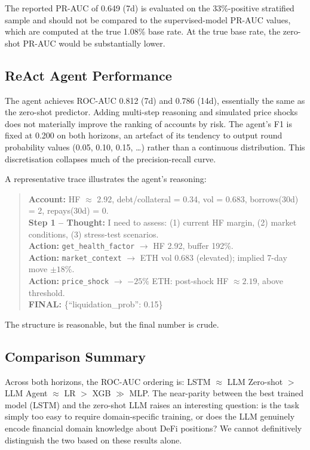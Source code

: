 \documentclass[12pt,a4paper]{article}
\begin{document}
The reported PR-AUC of 0.649 (7d) is evaluated on the 33\%-positive
stratified sample and should not be compared to the supervised-model
PR-AUC values, which are computed at the true 1.08\% base rate.  At the
true base rate, the zero-shot PR-AUC would be substantially lower.

\subsection{ReAct Agent Performance}

The agent achieves ROC-AUC 0.812 (7d) and 0.786 (14d), essentially the
same as the zero-shot predictor.  Adding multi-step reasoning and simulated
price shocks does not materially improve the ranking of accounts by risk.
The agent's F1 is fixed at 0.200 on both horizons, an artefact of its
tendency to output round probability values (0.05, 0.10, 0.15, \ldots)
rather than a continuous distribution.  This discretisation collapses much
of the precision-recall curve.

A representative trace illustrates the agent's reasoning:

\begin{quote}
\small
\textbf{Account:} HF $\approx$ 2.92, debt/collateral = 0.34,
vol = 0.683, borrows(30d) = 2, repays(30d) = 0.\\[0.3em]
\textbf{Step 1 -- Thought:} I need to assess: (1) current HF margin,
(2) market conditions, (3) stress-test scenarios.\\[0.3em]
\textbf{Action:} \texttt{get\_health\_factor} $\rightarrow$
HF 2.92, buffer 192\%.\\[0.3em]
\textbf{Action:} \texttt{market\_context} $\rightarrow$
ETH vol 0.683 (elevated); implied 7-day move $\pm 18$\%.\\[0.3em]
\textbf{Action:} \texttt{price\_shock} $\rightarrow$
$-25\%$ ETH: post-shock HF $\approx 2.19$, above threshold.\\[0.3em]
\textbf{FINAL:} \{``liquidation\_prob'': 0.15\}
\end{quote}

\noindent
The structure is reasonable, but the final number is crude.

\subsection{Comparison Summary}

Across both horizons, the ROC-AUC ordering is:
LSTM $\approx$ LLM Zero-shot $>$ LLM Agent $\approx$ LR $>$ XGB $\gg$ MLP.
The near-parity between the best trained model (LSTM) and the zero-shot LLM
raises an interesting question: is the task simply too easy to require
domain-specific training, or does the LLM genuinely encode financial domain
knowledge about DeFi positions?  We cannot definitively distinguish the two
based on these results alone.
\end{document}
